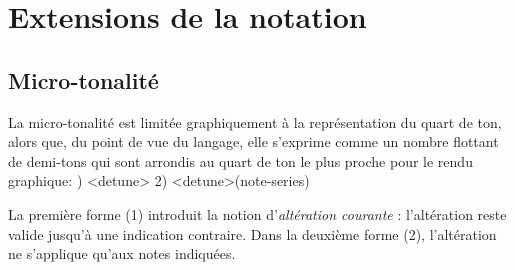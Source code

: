 \documentclass{article}
\newenvironment{gmncode}	{\vspace{-2mm}\small\verbatim}{\endverbatim\vspace{-2mm}}
\begin{document}
\section{Extensions de la notation}\label{sec:extension}

\subsection{Micro-tonalité}\label{subsec:micro}

La micro-tonalité est limitée graphiquement à la représentation du quart de ton, alors que, du point de vue du langage, elle s'exprime comme un nombre flottant de demi-tons qui sont arrondis au quart de ton le plus proche pour le rendu graphique: 
\begin{gmncode}
    1)  \alter<detune>
    2)  \alter<detune>(note-series)
\end{gmncode}

La première forme (1) introduit la notion d'\emph{altération courante} : l'altération reste valide jusqu'à une indication contraire. Dans la deuxième forme (2), l'altération ne s'applique qu'aux notes indiquées.
\newpage
\end{document}
